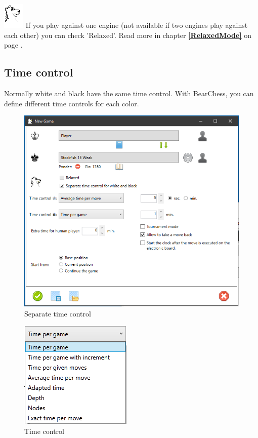 \documentclass[11pt,a4paper]{article}
\begin{document}
\includegraphics[scale=0.8]{BearChessIcon.png} If you play against one engine (not available if two engines play against each other) you can check 'Relaxed'.  Read more in chapter \textbf{\ref{RelaxedMode}  } on page \pageref{RelaxedMode}.


\subsection{Time control}

Normally white and black have the same time control. With BearChess, you can define different time controls for each color.

\begin{figure}[H]
	\centering
	\includegraphics[scale=0.7]{NewGame3.png}
	\caption{Separate time control}
	\label{fig:NewGame3}
\end{figure}


\begin{figure}[H]
	\centering
	\includegraphics[scale=1.0]{TimeControl.png}
	\caption{Time control}
	\label{fig:TimeControl}
\end{figure}
\end{document}
